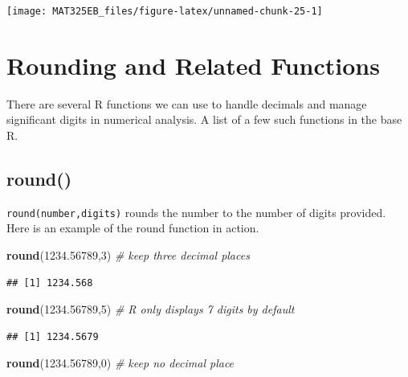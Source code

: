 \documentclass[
]{book}
\newenvironment{Shaded}{\begin{snugshade}}{\end{snugshade}}
\newcommand{\CommentTok}[1]{\textcolor[rgb]{0.56,0.35,0.01}{\textit{#1}}}
\newcommand{\DecValTok}[1]{\textcolor[rgb]{0.00,0.00,0.81}{#1}}
\newcommand{\FloatTok}[1]{\textcolor[rgb]{0.00,0.00,0.81}{#1}}
\newcommand{\FunctionTok}[1]{\textcolor[rgb]{0.13,0.29,0.53}{\textbf{#1}}}
\newcommand{\NormalTok}[1]{#1}
\begin{document}
\begin{center}\texttt{[image: MAT325EB\_files/figure-latex/unnamed-chunk-25-1]} \end{center}

\hypertarget{rounding-and-related-functions}{%
\section{Rounding and Related Functions}\label{rounding-and-related-functions}}

There are several R functions we can use to handle decimals and manage significant digits in numerical analysis. A list of a few such functions in the base R.

\hypertarget{round}{%
\subsection{round()}\label{round}}

\texttt{round(number,digits)} rounds the number to the number of digits provided. Here is an example of the round function in action.

\begin{Shaded}
\begin{Highlighting}[]
\FunctionTok{round}\NormalTok{(}\FloatTok{1234.56789}\NormalTok{,}\DecValTok{3}\NormalTok{)    }\CommentTok{\# keep three decimal places}
\end{Highlighting}
\end{Shaded}

\begin{verbatim}
## [1] 1234.568
\end{verbatim}

\begin{Shaded}
\begin{Highlighting}[]
\FunctionTok{round}\NormalTok{(}\FloatTok{1234.56789}\NormalTok{,}\DecValTok{5}\NormalTok{)    }\CommentTok{\# R only displays 7 digits by default}
\end{Highlighting}
\end{Shaded}

\begin{verbatim}
## [1] 1234.5679
\end{verbatim}

\begin{Shaded}
\begin{Highlighting}[]
\FunctionTok{round}\NormalTok{(}\FloatTok{1234.56789}\NormalTok{,}\DecValTok{0}\NormalTok{)    }\CommentTok{\# keep no decimal place}
\end{Highlighting}
\end{Shaded}
\end{document}
